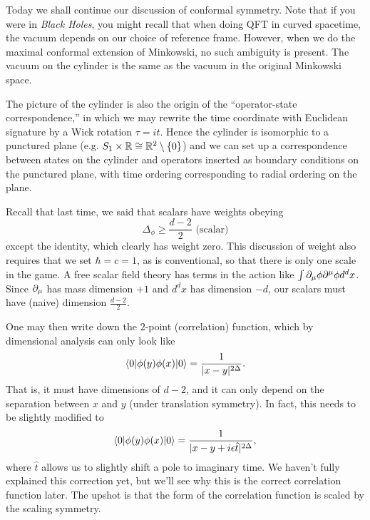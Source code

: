 Today we shall continue our discussion of conformal symmetry. Note that if you were in \emph{Black Holes}, you might recall that when doing QFT in curved spacetime, the vacuum depends on our choice of reference frame. However, when we do the maximal conformal extension of Minkowski, no such ambiguity is present. The vacuum on the cylinder is the same as the vacuum in the original Minkowski space.

The picture of the cylinder is also the origin of the ``operator-state correspondence,'' in which we may rewrite the time coordinate with Euclidean signature by a Wick rotation $\tau = it$. Hence the cylinder is isomorphic to a punctured plane (e.g. $S_1 \times \mathbb{R} \cong \mathbb{R}^2 \setminus \{0\}$) and we can set up a correspondence between states on the cylinder and operators inserted as boundary conditions on the punctured plane, with time ordering corresponding to radial ordering on the plane.

Recall that last time, we said that scalars have weights obeying 
\begin{equation}
    \Delta_\phi \geq \frac{d-2}{2}\text{ (scalar)}
\end{equation}
except the identity, which clearly has weight zero. This discussion of weight also requires that we set $\hbar=c=1$, as is conventional, so that there is only one scale in the game. A free scalar field theory has terms in the action like $\int \partial_\mu \phi \partial^\mu \phi d^dx$. Since $\partial_\mu$ has mass dimension $+1$ and $d^dx$ has dimension $-d$, our scalars must have (naive) dimension $\frac{d-2}{2}$.

One may then write down the $2$-point (correlation) function, which by dimensional analysis can only look like
\begin{equation}
    \langle0\rvert \phi(y) \phi(x) \lvert0\rangle =\frac{1}{|x-y|^{2\Delta}}.
\end{equation}
That is, it must have dimensions of $d-2$, and it can only depend on the separation between $x$ and $y$ (under translation symmetry). In fact, this needs to be slightly modified to
\begin{equation}
    \langle0\rvert \phi(y) \phi(x) \lvert0\rangle =\frac{1}{|x-y+i\epsilon \hat t|^{2\Delta}},
\end{equation}
where $\hat t$ allows us to slightly shift a pole to imaginary time. We haven't fully explained this correction yet, but we'll see why this is the correct correlation function later. The upshot is that the form of the correlation function is scaled by the scaling symmetry.

